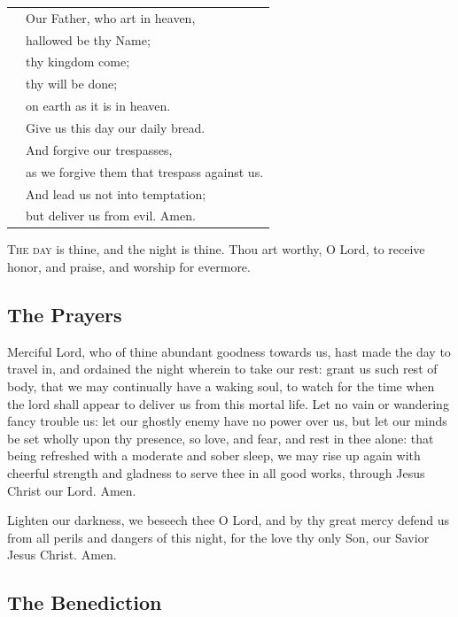 \documentclass{article}
\begin{document}
\begin{tabularx}{\linewidth}{lX}
    & Our Father, who art in heaven, \\
    & hallowed be thy Name; \\
    & thy kingdom come; \\
    & thy will be done; \\
    & on earth as it is in heaven. \\
    & Give us this day our daily bread. \\
    & And forgive our trespasses, \\
    & as we forgive them that trespass against us. \\
    & And lead us not into temptation; \\
    & but deliver us from evil. Amen. \\
\end{tabularx}


\textsc{The day} is thine, and the night is thine. Thou art 
worthy, O Lord, to receive honor, and praise, and worship
for evermore.

\subsection*{The Prayers}


Merciful Lord, who of thine abundant goodness towards us, hast
made the day to travel in, and ordained the night wherein to take our rest:
grant us such rest of body, that we may continually have a waking soul,
to watch for the time when the lord shall appear to deliver us from this mortal life.
Let no vain or wandering fancy trouble us: let our ghostly enemy have no power over us,
but let our minds be set wholly upon thy presence, so love, and fear, and rest in thee
alone: that being refreshed with a moderate and sober sleep, we may rise up again
with cheerful strength and gladness to serve thee in all good works,
through Jesus Christ our Lord. Amen.


Lighten our darkness, we beseech thee O Lord, and by thy great
mercy defend us from all perils and dangers of this night, for the love thy only Son,
our Savior Jesus Christ. Amen.

\subsection*{The Benediction}
\end{document}
